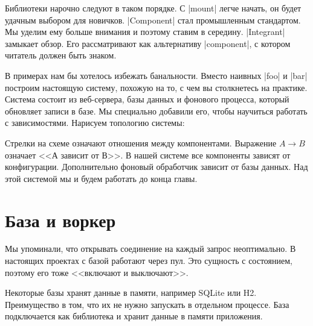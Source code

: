 Библиотеки нарочно следуют в таком порядке. С \spverb|mount| легче начать, он
будет удачным выбором для новичков. \spverb|Component| стал промышленным
стандартом. Мы уделим ему больше внимания и поэтому ставим в
середину. \spverb|Integrant| замыкает обзор. Его рассматривают как альтернативу
\spverb|component|, с котором читатель должен быть знаком.

В примерах нам бы хотелось избежать банальности. Вместо наивных \spverb|foo| и
\spverb|bar| построим настоящую систему, похожую на то, с чем вы столкнетесь на
практике. Система состоит из веб-сервера, базы данных и фонового процесса,
который обновляет записи в базе. Мы специально добавили его, чтобы научиться
работать с зависимостями. Нарисуем топологию системы:

\vspace{1em}
\vspace{1em}

Стрелки на схеме означают отношения между компонентами. Выражение $A \to B$
означает <<А зависит от В>>. В нашей системе все компоненты зависят от
конфигурации. Дополнительно фоновый обработчик зависит от базы данных. Над этой
системой мы и будем работать до конца главы.

\section{База и воркер}

Мы упоминали, что открывать соединение на каждый запрос неоптимально. В
настоящих проектах с базой работают через пул. Это сущность с состоянием,
поэтому его тоже <<включают и выключают>>.

Некоторые базы хранят данные в памяти, например SQLite или H2. Преимущество в
том, что их не нужно запускать в отдельном процессе. База подключается как
библиотека и хранит данные в памяти приложения.


